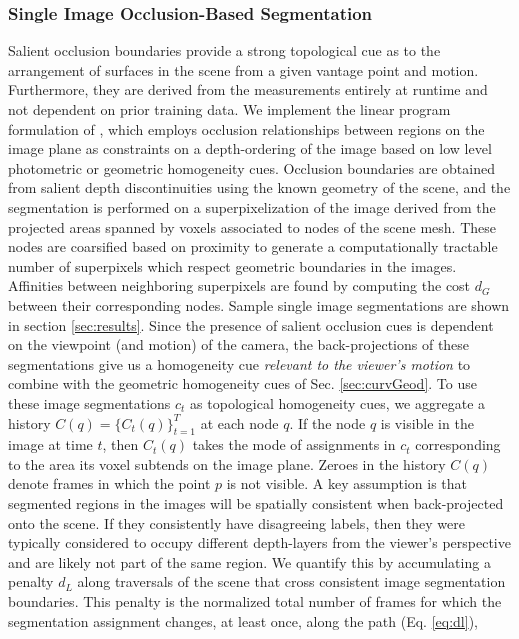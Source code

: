 \subsubsection{Single Image Occlusion-Based Segmentation}\label{sec:signatures}
Salient occlusion boundaries provide a strong topological cue as to the arrangement of surfaces in
the scene from a given vantage point and motion. Furthermore, they are derived from the measurements entirely at
runtime and not dependent on prior training data. We implement the linear program formulation of
\cite{ayvaciS12PAMI}, which employs occlusion relationships between regions on the image plane as
constraints on a depth-ordering of the image based on low level photometric
or geometric homogeneity cues.
Occlusion boundaries are obtained from salient depth discontinuities using the known geometry
of the scene, and the segmentation is performed on a superpixelization of the image derived from
the projected areas spanned by voxels associated to nodes of the scene mesh. These nodes are
coarsified based on proximity to generate a computationally tractable number of superpixels which
respect geometric boundaries in the images. Affinities between neighboring superpixels are found by
computing the cost $d_G$ between their corresponding nodes. Sample single
image segmentations are shown in section \ref{sec:results}.
Since the presence of salient occlusion cues is dependent on the viewpoint (and motion) of the camera, 
the back-projections of these segmentations give us a homogeneity cue \emph{relevant to the viewer's motion} to combine 
with the geometric homogeneity cues of Sec. \ref{sec:curvGeod}. To use these image segmentations $c_t$ as topological 
homogeneity cues, we aggregate a history $C(q) = \{C_t(q)\}_{t=1}^T$ at each node $q$. If the node $q$ is visible
in the image at time $t$, then $C_t(q)$ takes the mode of assignments in $c_t$ corresponding to the area its voxel subtends on the image plane. Zeroes in the history $C(q)$ denote frames in which the point $p$ is not visible.
A key assumption is that segmented regions in the images will be spatially consistent when
back-projected onto the scene. If they consistently have disagreeing 
labels, then they were typically considered to occupy different depth-layers from the viewer's perspective and are likely not part of the same region. 
We quantify this by accumulating a penalty $d_L$ along traversals of the scene that cross consistent image segmentation boundaries.
This penalty is the normalized total number of frames for which
the segmentation assignment changes, at least once, along the path (Eq. \ref{eq:dl}), 

